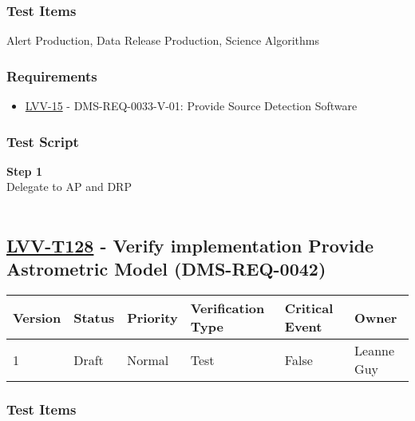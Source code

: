 \hypertarget{test-items-103}{%
\subsubsection{Test Items}\label{test-items-103}}

Alert Production, Data Release Production, Science Algorithms~

\hypertarget{requirements-104}{%
\subsubsection{Requirements}\label{requirements-104}}

\begin{itemize}
\tightlist
\item
  \href{https://jira.lsstcorp.org/browse/LVV-15}{LVV-15} -
  DMS-REQ-0033-V-01: Provide Source Detection Software
\end{itemize}

\hypertarget{test-script-104}{%
\subsubsection{Test Script}\label{test-script-104}}

\textbf{Step 1}\\
Delegate to AP and DRP\\
~\\

\hypertarget{lvv-t128---verify-implementation-provide-astrometric-model-dms-req-0042}{%
\subsection{\texorpdfstring{\href{https://jira.lsstcorp.org/secure/Tests.jspa\#/testCase/LVV-T128}{LVV-T128}
- Verify implementation Provide Astrometric Model
(DMS-REQ-0042)}{LVV-T128 - Verify implementation Provide Astrometric Model (DMS-REQ-0042)}}\label{lvv-t128---verify-implementation-provide-astrometric-model-dms-req-0042}}

\begin{longtable}[]{@{}llllll@{}}
\toprule
Version & Status & Priority & Verification Type & Critical Event &
Owner\tabularnewline
\midrule
\endhead
1 & Draft & Normal & Test & False & Leanne Guy\tabularnewline
\bottomrule
\end{longtable}

\hypertarget{test-items-104}{%
\subsubsection{Test Items}\label{test-items-104}}

